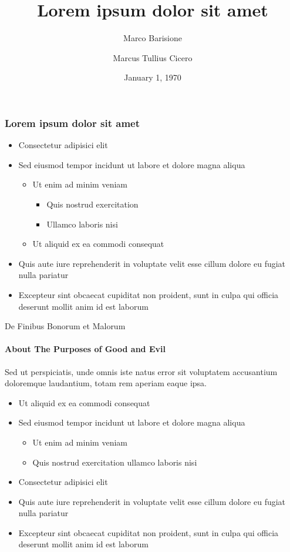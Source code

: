 \documentclass{beamer}
\author{Marco Barisione}
\author{Marcus Tullius Cicero}
\title{Lorem ipsum dolor sit amet}
\institute{Politecnico di Torino}
\date{January 1, 1970}
\begin{document}
\begin{frame}[t,plain]
\titlepage
\end{frame}

\begin{frame}[t]
\frametitle{Lorem ipsum dolor sit amet}

\begin{itemize}
\item Consectetur adipisici elit
\item Sed eiusmod tempor incidunt ut labore et dolore magna aliqua
  \begin{itemize}
  \item Ut enim ad minim veniam
    \begin{itemize}
    \item Quis nostrud exercitation
    \item Ullamco laboris nisi
    \end{itemize}
  \item Ut aliquid ex ea commodi consequat
  \end{itemize}
\item Quis aute iure reprehenderit in voluptate velit esse cillum dolore eu
      fugiat nulla pariatur
\item Excepteur sint obcaecat cupiditat non proident, sunt in culpa qui
      officia deserunt mollit anim id est laborum
\end{itemize}

\end{frame}

\begin{frame}[t]{De Finibus Bonorum et Malorum}
\framesubtitle{About The Purposes of Good and Evil}

Sed ut perspiciatis, unde omnis iste natus error sit voluptatem accusantium
doloremque laudantium, totam rem aperiam eaque ipsa.

\begin{itemize}
\item Ut aliquid ex ea commodi consequat
\item Sed eiusmod tempor incidunt ut labore et dolore magna aliqua
  \begin{itemize}
  \item Ut enim ad minim veniam
  \item Quis nostrud exercitation ullamco laboris nisi
  \end{itemize}
\item Consectetur adipisici elit
\item Quis aute iure reprehenderit in voluptate velit esse cillum dolore eu
      fugiat nulla pariatur
\item Excepteur sint obcaecat cupiditat non proident, sunt in culpa qui
      officia deserunt mollit anim id est laborum
\end{itemize}

\end{frame}
\end{document}
